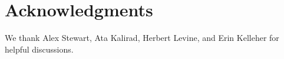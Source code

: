 \documentclass[9pt,lineno]{elife}
\begin{document}








\section{Acknowledgments}

We thank Alex Stewart, Ata Kalirad, Herbert Levine, and Erin Kelleher for helpful discussions.  




\end{document}
